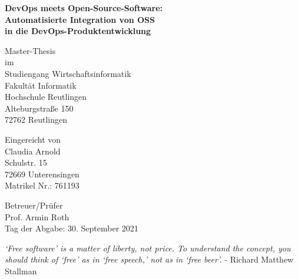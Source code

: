 \documentclass[12pt,titlepage]{report}
\begin{document}
\begin{titlepage}
        \setlength{\parindent}{0pt}
        \textbf{DevOps meets Open-Source-Software: \\Automatisierte Integration von OSS \\in die DevOps-Produktentwicklung}
 
        \vspace{6cm}
        Master-Thesis\\
        im\\
        Studiengang Wirtschaftsinformatik\\
        Fakultät Informatik\\
        Hochschule Reutlingen\\
        Alteburgstraße 150\\
        72762 Reutlingen\\
        \vspace{2.4cm}
    
        Eingereicht von\\
        Claudia Arnold\\
        Schulstr. 15\\
        72669 Unterensingen\\
        Matrikel Nr.: 761193\\
        \vspace{0.4cm}

        Betreuer/Prüfer\\
        Prof. Armin Roth\\
        Tag der Abgabe: 30. September 2021\\
        \restoregeometry
 \end{titlepage}


{}

\newpage  
\begin{center} 
    \vspace*{\fill}
    \textit{‘Free software’ is a matter of liberty, not price. To understand the concept, you should think of ‘free’ as in ‘free speech,’ not as in ‘free beer’.}
    \newline
    \newline - Richard Matthew Stallman
    \vspace*{\fill}
\end{center}
\end{document}
